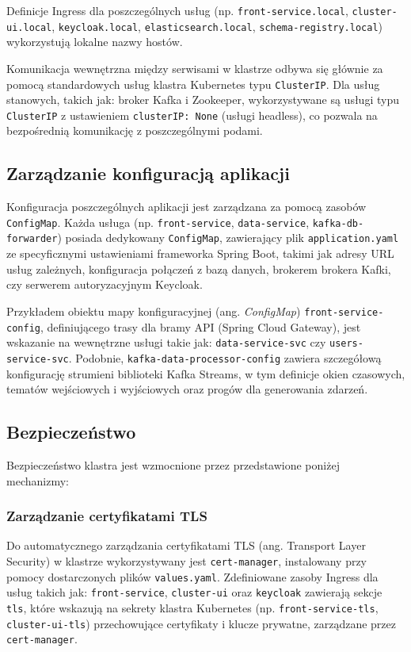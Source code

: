 Definicje Ingress dla poszczególnych usług (np. \texttt{front-service.local}, \texttt{cluster-ui.local}, \texttt{keycloak.local}, \texttt{elasticsearch.local}, \texttt{schema-registry.local}) wykorzystują lokalne nazwy hostów.

Komunikacja wewnętrzna między serwisami w klastrze odbywa się głównie za pomocą standardowych usług klastra Kubernetes typu \texttt{ClusterIP}. Dla usług stanowych, takich jak: broker Kafka i Zookeeper, wykorzystywane są usługi typu \texttt{ClusterIP} z ustawieniem \texttt{clusterIP: None} (usługi headless), co pozwala na bezpośrednią komunikację z poszczególnymi podami.

\subsection{Zarządzanie konfiguracją aplikacji} 

Konfiguracja poszczególnych aplikacji jest zarządzana za pomocą zasobów \texttt{ConfigMap}. Każda usługa (np. \texttt{front-service}, \texttt{data-service}, \texttt{kafka-db-forwarder}) posiada dedykowany \texttt{ConfigMap}, zawierający plik \texttt{application.yaml} ze specyficznymi ustawieniami frameworka Spring Boot, takimi jak adresy URL usług zależnych, konfiguracja połączeń z bazą danych, brokerem brokera Kafki, czy serwerem autoryzacyjnym Keycloak.

Przykładem obiektu mapy konfiguracyjnej (ang. \textit{ConfigMap}) \texttt{front-service-config}, definiującego trasy dla bramy API (Spring Cloud Gateway), jest wskazanie na wewnętrzne usługi takie jak: \texttt{data-service-svc} czy \texttt{users-service-svc}. Podobnie, \texttt{kafka-data-processor-config} zawiera szczegółową konfigurację strumieni biblioteki Kafka Streams, w tym definicje okien czasowych, tematów wejściowych i wyjściowych oraz progów dla generowania zdarzeń.

\subsection{Bezpieczeństwo}

Bezpieczeństwo klastra jest wzmocnione przez przedstawione poniżej mechanizmy:

\subsubsection{Zarządzanie certyfikatami TLS}
Do automatycznego zarządzania certyfikatami TLS (ang. Transport Layer Security) w klastrze wykorzystywany jest \texttt{cert-manager}, instalowany przy pomocy dostarczonych plików \texttt{values.yaml}. Zdefiniowane zasoby Ingress dla usług takich jak: \texttt{front-service}, \texttt{cluster-ui} oraz \texttt{keycloak} zawierają sekcje \texttt{tls}, które wskazują na sekrety klastra Kubernetes (np. \texttt{front-service-tls}, \texttt{cluster-ui-tls}) przechowujące certyfikaty i klucze prywatne, zarządzane przez \texttt{cert-manager}.

